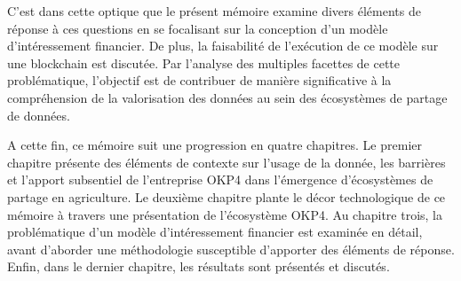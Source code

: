 C'est dans cette optique que le présent mémoire examine divers éléments de réponse à ces questions en se focalisant sur la conception d'un modèle d'intéressement financier. De plus, la faisabilité de l'exécution de ce modèle sur une blockchain est discutée. Par l'analyse des multiples facettes de cette problématique, l'objectif est de contribuer de manière significative à la compréhension de la valorisation des données au sein des écosystèmes de partage de données.

A cette fin, ce mémoire suit une progression en quatre chapitres. Le premier chapitre présente des éléments de contexte sur l'usage de la donnée, les barrières et l'apport subsentiel de l'entreprise OKP4 dans l'émergence d'écosystèmes de partage en agriculture. Le deuxième chapitre plante le décor technologique de ce mémoire à travers une présentation de l'écosystème OKP4. Au chapitre trois, la problématique d'un modèle d'intéressement financier est examinée en détail, avant d'aborder une méthodologie susceptible d'apporter des éléments de réponse. Enfin, dans le dernier chapitre, les résultats sont présentés et discutés.


